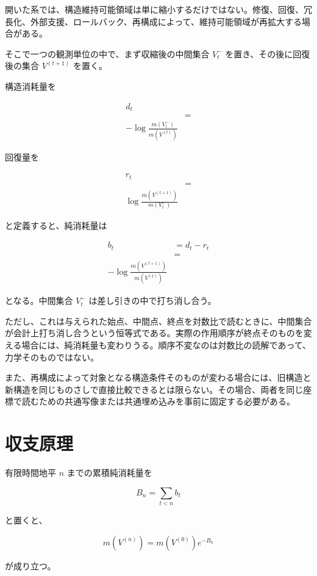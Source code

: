 \documentclass[12pt,a4paper]{article}
\begin{document}
開いた系では、構造維持可能領域は単に縮小するだけではない。修復、回復、冗長化、外部支援、ロールバック、再構成によって、維持可能領域が再拡大する場合がある。

そこで一つの観測単位の中で、まず収縮後の中間集合 \(V_{t}^-\) を置き、その後に回復後の集合 \(V^{(t+1)}\) を置く。

構造消耗量を

\[
\begin{aligned}
d_{t} \\
&= \\
-\log\frac{m(V_{t}^-)}{m(V^{(t)})}
\end{aligned}
\]

回復量を

\[
\begin{aligned}
r_{t} \\
&= \\
\log\frac{m(V^{(t+1)})}{m(V_{t}^-)}
\end{aligned}
\]

と定義すると、純消耗量は

\[
\begin{aligned}
b_{t}&=d_{t}-r_{t} \\
&= \\
-\log\frac{m(V^{(t+1)})}{m(V^{(t)})}
\end{aligned}
\]

となる。中間集合 \(V_{t}^-\) は差し引きの中で打ち消し合う。

ただし、これは与えられた始点、中間点、終点を対数比で読むときに、中間集合が会計上打ち消し合うという恒等式である。実際の作用順序が終点そのものを変える場合には、純消耗量も変わりうる。順序不変なのは対数比の読解であって、力学そのものではない。

また、再構成によって対象となる構造条件そのものが変わる場合には、旧構造と新構造を同じものさしで直接比較できるとは限らない。その場合、両者を同じ座標で読むための共通写像または共通埋め込みを事前に固定する必要がある。

\section{収支原理}\label{ux53ceux652fux539fux7406}

有限時間地平 \(n\) までの累積純消耗量を

\[
B_{n}=\sum_{t<n} b_{t}
\]

と置くと、

\[
m(V^{(n)})=m(V^{(0)})e^{-B_{n}}
\]

が成り立つ。
\end{document}
